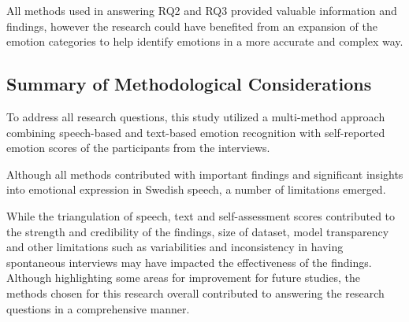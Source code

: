 All methods used in answering RQ2 and RQ3 provided valuable information and findings, however the research could have benefited from an expansion of the emotion categories to help identify emotions in a more accurate and complex way.

\subsection{Summary of Methodological Considerations}
To address all research questions, this study utilized a multi-method approach combining speech-based and text-based emotion recognition with self-reported emotion scores of the participants from the interviews. 

Although all methods contributed with important findings and significant insights into emotional expression in Swedish speech, a number of limitations emerged.

While the triangulation of speech, text and self-assessment scores contributed to the strength and credibility of the findings, size of dataset, model transparency and other limitations such as variabilities and inconsistency in having spontaneous interviews may have impacted the effectiveness of the findings. Although highlighting some areas for improvement for future studies, the methods chosen for this research overall contributed to answering the research questions in a comprehensive manner.